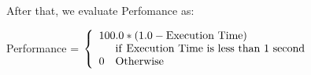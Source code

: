 \documentclass[11pt,a4paper]{article}
\begin{document}
  After that, we evaluate Perfomance as:

  \begin{mdframed}
    \center
Performance = $\left\{
    \begin{array}{ll}
        \multicolumn{2}{l}{100.0 * (1.0 - {\rm Execution~Time})} \\
          & {\rm if~Execution~Time~is~less~than~1~second}  \\
        0 & {\rm Otherwise}
    \end{array}
    \right.$
  \end{mdframed}




\end{document}
